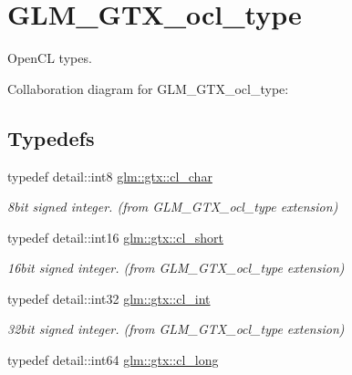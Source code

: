 \hypertarget{group__gtx__ocl__type}{}\section{G\+L\+M\+\_\+\+G\+T\+X\+\_\+ocl\+\_\+type}
\label{group__gtx__ocl__type}


Open\+C\+L types.  


Collaboration diagram for G\+L\+M\+\_\+\+G\+T\+X\+\_\+ocl\+\_\+type\+:
\subsection*{Typedefs}
\begin{DoxyCompactItemize}
\item 
\hypertarget{group__gtx__ocl__type_ga54749fbb32c6aa8fdd23433c4d264dcb}{}typedef detail\+::int8 \hyperlink{group__gtx__ocl__type_ga54749fbb32c6aa8fdd23433c4d264dcb}{glm\+::gtx\+::cl\+\_\+char}\label{group__gtx__ocl__type_ga54749fbb32c6aa8fdd23433c4d264dcb}

\begin{DoxyCompactList}\small\item\em 8bit signed integer. (from G\+L\+M\+\_\+\+G\+T\+X\+\_\+ocl\+\_\+type extension) \end{DoxyCompactList}\item 
\hypertarget{group__gtx__ocl__type_gaca25eea4c48e33d6bd7661729a98ce06}{}typedef detail\+::int16 \hyperlink{group__gtx__ocl__type_gaca25eea4c48e33d6bd7661729a98ce06}{glm\+::gtx\+::cl\+\_\+short}\label{group__gtx__ocl__type_gaca25eea4c48e33d6bd7661729a98ce06}

\begin{DoxyCompactList}\small\item\em 16bit signed integer. (from G\+L\+M\+\_\+\+G\+T\+X\+\_\+ocl\+\_\+type extension) \end{DoxyCompactList}\item 
\hypertarget{group__gtx__ocl__type_gab12a8f2571ab59f3296b8f0d08caac85}{}typedef detail\+::int32 \hyperlink{group__gtx__ocl__type_gab12a8f2571ab59f3296b8f0d08caac85}{glm\+::gtx\+::cl\+\_\+int}\label{group__gtx__ocl__type_gab12a8f2571ab59f3296b8f0d08caac85}

\begin{DoxyCompactList}\small\item\em 32bit signed integer. (from G\+L\+M\+\_\+\+G\+T\+X\+\_\+ocl\+\_\+type extension) \end{DoxyCompactList}\item 
\hypertarget{group__gtx__ocl__type_gae5602e07aba55d358cb681c4df5ffc07}{}typedef detail\+::int64 \hyperlink{group__gtx__ocl__type_gae5602e07aba55d358cb681c4df5ffc07}{glm\+::gtx\+::cl\+\_\+long}\label{group__gtx__ocl__type_gae5602e07aba55d358cb681c4df5ffc07}


\end{DoxyCompactItemize}
